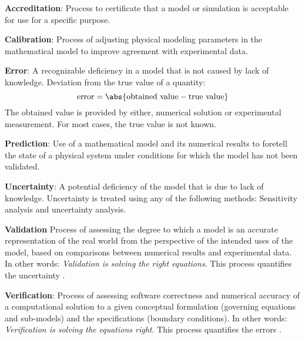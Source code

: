 \begin{description}
\item{\textbf{Accreditation}:} Process to certificate that a model or simulation is acceptable for use for a specific purpose.
\item{\textbf{Calibration}:} Process of adjusting physical modeling parameters in the mathematical model to improve agreement with experimental data.
\item{\textbf{Error}:} A recognizable deficiency in a model that is not caused by lack of knowledge. Deviation from the true value of a quantity:
\begin{equation}
  \text{error}=\abs{\text{obtained value}-\text{true value}}
\end{equation}
The obtained value is provided by either, numerical solution or experimental measurement. For most cases, the true value is not known.%
\item{\textbf{Prediction}}: Use of a mathematical model and its numerical results to foretell the state of a physical system under conditions for which the model has not been validated.
\item{\textbf{Uncertainty}}: A potential deficiency of the model that is due to lack of knowledge. Uncertainty is treated using any of the following methods: Sensitivity analysis and uncertainty analysis.
\item{\textbf{Validation}} Process of assessing the degree to which a model is an accurate representation of the real world from the perspective of the intended uses of the model, based on comparisons between numerical results and experimental data.  In other words:
\textit{Validation is solving the right equations}. This process quantifies the uncertainty \cite{Versteeg}.
\item{\textbf{Verification}:} Process of assessing software correctness and numerical accuracy of a computational solution to a given conceptual formulation (governing equations and sub-models) and the specifications (boundary conditions). In other words:
\textit{Verification is solving the equations right}. This process quantifies the errors \cite{Versteeg}.
\end{description}

